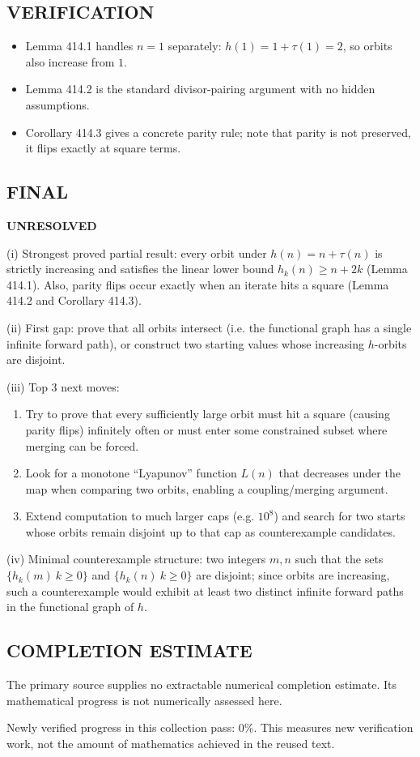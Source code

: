\subsection*{VERIFICATION}
\begin{itemize}
  \item Lemma 414.1 handles $n=1$ separately: $h(1)=1+\tau(1)=2$, so orbits also increase from $1$.
  \item Lemma 414.2 is the standard divisor-pairing argument with no hidden assumptions.
  \item Corollary 414.3 gives a concrete parity rule; note that parity is not preserved, it flips exactly at square terms.
\end{itemize}

\subsection*{FINAL}
\textbf{UNRESOLVED}

(i) Strongest proved partial result: every orbit under $h(n)=n+\tau(n)$ is strictly increasing and satisfies the linear lower bound $h_k(n)\ge n+2k$ (Lemma 414.1). Also, parity flips occur exactly when an iterate hits a square (Lemma 414.2 and Corollary 414.3).

(ii) First gap: prove that all orbits intersect (i.e. the functional graph has a single infinite forward path), or construct two starting values whose increasing $h$-orbits are disjoint.

(iii) Top 3 next moves:
\begin{enumerate}
  \item Try to prove that every sufficiently large orbit must hit a square (causing parity flips) infinitely often or must enter some constrained subset where merging can be forced.
  \item Look for a monotone ``Lyapunov'' function $L(n)$ that decreases under the map when comparing two orbits, enabling a coupling/merging argument.
  \item Extend computation to much larger caps (e.g. $10^8$) and search for two starts whose orbits remain disjoint up to that cap as counterexample candidates.
\end{enumerate}

(iv) Minimal counterexample structure: two integers $m,n$ such that the sets $\{h_k(m)\:k\ge0\}$ and $\{h_k(n)\:k\ge0\}$ are disjoint; since orbits are increasing, such a counterexample would exhibit at least two distinct infinite forward paths in the functional graph of $h$.




\subsection*{COMPLETION ESTIMATE}
The primary source supplies no extractable numerical completion estimate. Its mathematical progress is not numerically assessed here.

Newly verified progress in this collection pass: $0\%$. This measures new verification work, not the amount of mathematics achieved in the reused text.
